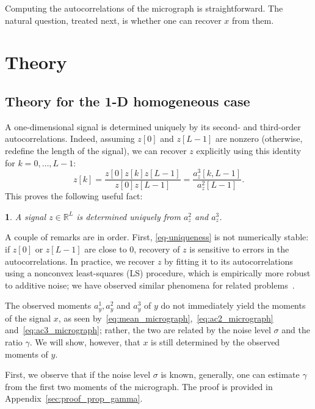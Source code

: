 \documentclass[12pt]{article}
\newcommand{\1}{\mathbf{1}}
\newcommand{\RL}{\mathbb{R}^L}
\theoremstyle{plain}
\theoremstyle{definition}
\theoremstyle{remark}
\theoremstyle{plain}
\theoremstyle{remark}
\theoremstyle{plain}
\theoremstyle{plain}
\newtheorem{proposition}[thm]{\protect\propositionname}
\providecommand{\propositionname}{Proposition}
\begin{document}
Computing the autocorrelations of the micrograph is straightforward. The natural question, treated next, is whether one can recover $x$ from them.


\section{Theory}

\subsection{Theory for the 1-D homogeneous case}

A one-dimensional signal is determined uniquely by its second- and third-order autocorrelations. Indeed, assuming $z[0]$ and $z[L-1]$ are nonzero (otherwise, redefine the length of the signal), we can recover $z$ explicitly using this identity for $k = 0, \ldots, L-1$:
%
\begin{equation}
%
z[k]  = \frac{z[0]z[k]z[L-1]}{z[0]z[L-1]} = \frac{a_z^3[k,L-1]}{a_z^2[L-1]}.
\label{eq-uniqueness}
%
\end{equation}
This proves the following useful fact:
\begin{proposition} \label{prop:uniqueness}
	A signal $z\in\RL$ is determined uniquely from  $a_z^2$ and $a_z^3$.
\end{proposition}

A couple of remarks are in order. First, \eqref{eq-uniqueness} is not numerically stable: if $z[0]$ or $z[L-1]$ are close to 0, recovery of $z$ is sensitive to errors in the autocorrelations. In practice, we recover $z$ by fitting it to its autocorrelations using a nonconvex least-squares (LS) procedure, which is empirically more robust to additive noise; we have observed similar phenomena for related problems~\cite{bendory2017bispectrum,boumal2017heterogeneous,abbe2017multireference}.

The observed moments $a_y^1,a_y^2$ and $a_y^3$ of $y$ do not immediately yield the moments of the signal $x$, as seen by~\eqref{eq:mean_micrograph},~\eqref{eq:ac2_micrograph} and~\eqref{eq:ac3_micrograph}; rather, the two are related by the noise level $\sigma$ and the ratio $\gamma$. We will show, however, that $x$ is still determined by the observed moments of $y$.

First, we observe that if the noise level $\sigma$ is known, generally, one can estimate $\gamma$ from the first two moments of the micrograph. The proof is provided in Appendix~\ref{sec:proof_prop_gamma}.
\end{document}
